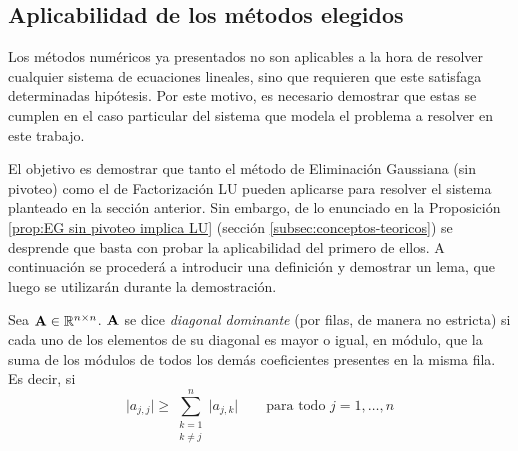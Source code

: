     \subsection{Aplicabilidad de los métodos elegidos}

        Los métodos numéricos ya presentados no son aplicables a la hora de resolver cualquier sistema de ecuaciones lineales, sino que requieren que este satisfaga determinadas hipótesis. Por este motivo, es necesario demostrar que estas se cumplen en el caso particular del sistema que modela el problema a resolver en este trabajo.

        El objetivo es demostrar que tanto el método de Eliminación Gaussiana (sin pivoteo) como el de Factorización LU pueden aplicarse para resolver el sistema planteado en la sección anterior. Sin embargo, de lo enunciado en la Proposición \ref{prop:EG sin pivoteo implica LU} (sección \ref{subsec:conceptos-teoricos}) se desprende que basta con probar la aplicabilidad del primero de ellos. A continuación se procederá a introducir una definición y demostrar un lema, que luego se utilizarán durante la demostración.

        \begin{defi}
            Sea $\mathbf{A} \in \mathbb{R}^{n \times n}$. $\mathbf{A}$ se dice \emph{diagonal dominante} (por filas, de manera no estricta) si cada uno de los elementos de su diagonal es mayor o igual, en módulo, que la suma de los módulos de todos los demás coeficientes presentes en la misma fila. Es decir, si
            \[ \vert a_{j,j} \vert \geq \sum_{\substack{k=1 \\ k \neq j}}^n \vert a_{j,k} \vert \qquad \text{para todo $j = 1, \dots, n$} \]
        \end{defi}


